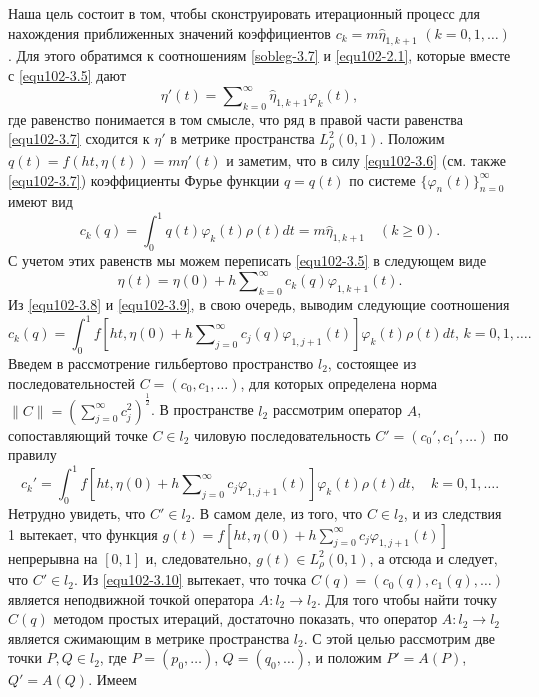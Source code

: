 Наша цель состоит в том, чтобы сконструировать итерационный процесс для нахождения приближенных значений коэффициентов $c_k=m\hat \eta_{1,k+1}$ $(k=0,1,\ldots)$. Для этого обратимся к соотношениям \eqref{sobleg-3.7} и \eqref{equ102-2.1}, которые вместе с \eqref{equ102-3.5} дают
\begin{equation}\label{equ102-3.7}
\eta'(t)=  \sum\nolimits_{k=0}^\infty \hat \eta_{1,k+1}\varphi_k(t),
\end{equation}
где равенство понимается в том смысле, что ряд в правой части равенства \eqref{equ102-3.7} сходится к $\eta'$ в метрике пространства $L^2_{\rho}(0,1)$. Положим $q(t)=f(ht,\eta(t))=m\eta'(t)$ и заметим, что в силу  \eqref{equ102-3.6} (см. также \eqref{equ102-3.7}) коэффициенты Фурье функции $q=q(t)$ по системе  $\{\varphi_{n}(t)\}_{n=0}^\infty$ имеют вид
\begin{equation}\label{equ102-3.8}
 c_k(q)=\int_{0}^1 q(t)\varphi_{k}(t)\rho(t)dt=m\hat \eta_{1,k+1} \quad (k\ge0).
\end{equation}
С учетом этих равенств мы можем переписать \eqref{equ102-3.5} в следующем виде
\begin{equation}\label{equ102-3.9}
\eta(t)= \eta(0)+ h\sum\nolimits_{k=0}^\infty c_k(q){\varphi}_{1,k+1}(t).
\end{equation}
Из  \eqref{equ102-3.8} и \eqref{equ102-3.9}, в свою очередь, выводим следующие соотношения
\begin{equation}\label{equ102-3.10}
c_k(q)=\int_{0}^1f\left[ht,\eta(0)+ h\sum\nolimits_{j=0}^\infty c_j(q)\varphi_{1,j+1}(t)\right]\varphi_k(t)\rho(t) dt,\, k=0,1,\ldots.
\end{equation}
Введем в рассмотрение гильбертово пространство $l_2$, состоящее из последовательностей $C=(c_0,c_1,\ldots)$, для которых определена норма
$\|C\|=\left(\sum_{j=0}^\infty c_j^2\right)^\frac12$.  В пространстве $l_2$ рассмотрим оператор $A$, сопоставляющий точке $C\in l_2$ чиловую последовательность $C'=(c_0',c_1',\ldots)$ по правилу
\begin{equation}\label{equ102-3.11}
c_k'=\int_{0}^1f\left[ht,\eta(0)+ h\sum\nolimits_{j=0}^\infty c_j
\varphi_{1,j+1}(t)\right]\varphi_k(t)\rho(t) dt,\quad k=0,1,\ldots.
\end{equation}
Нетрудно увидеть, что $C'\in l_2$. В самом деле, из того, что $C\in l_2$, и из следствия 1 вытекает, что функция $g(t)=f[ht,\eta(0)+ h\sum\nolimits_{j=0}^\infty c_j
\varphi_{1,j+1}(t)]$ непрерывна на $[0,1]$ и, следовательно, $g(t)\in L^2_\rho(0,1)$, а отсюда и следует, что $C'\in l_2$. Из  \eqref{equ102-3.10} вытекает, что точка $C(q)=(c_0(q),c_1(q),\ldots)$ является неподвижной точкой оператора $A:l_2\to l_2$. Для того чтобы найти точку $C(q)$ методом простых итераций, достаточно показать, что оператор $A:l_2\to l_2$ является сжимающим в метрике пространства $l_2$. С этой целью рассмотрим две точки $P,Q\in l_2$, где $P=(p_0,\ldots)$, $Q=(q_0,\ldots)$, и положим $P'=A(P)$, $Q'=A(Q)$. Имеем
